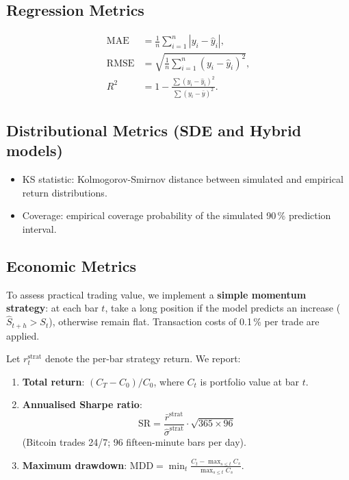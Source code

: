 \documentclass[12pt, a4paper, oneside]{report}
\theoremstyle{plain}
\theoremstyle{definition}
\theoremstyle{remark}
\begin{document}
\subsection{Regression Metrics}

\begin{align}
  \text{MAE} &= \tfrac{1}{n}\textstyle\sum_{i=1}^n |y_i - \hat y_i|, \\
  \text{RMSE} &= \sqrt{\tfrac{1}{n}\textstyle\sum_{i=1}^n (y_i - \hat y_i)^2}, \\
  R^2 &= 1 - \tfrac{\textstyle\sum (y_i - \hat y_i)^2}{\textstyle\sum (y_i - \bar y)^2}.
\end{align}

\subsection{Distributional Metrics (SDE and Hybrid models)}

\begin{itemize}[leftmargin=1.25cm]
  \item KS statistic: Kolmogorov-Smirnov distance between simulated and
    empirical return distributions.
  \item Coverage: empirical coverage probability of the simulated 90\,\%
    prediction interval.
\end{itemize}

\subsection{Economic Metrics}
\label{sec:econ_metrics}

To assess practical trading value, we implement a \textbf{simple momentum
strategy}: at each bar $t$, take a long position if the model predicts an
increase ($\hat S_{t+h} > S_t$), otherwise remain flat.  Transaction costs of
0.1\,\% per trade are applied.

Let $r_t^{\text{strat}}$ denote the per-bar strategy return.  We report:

\begin{enumerate}[leftmargin=1.25cm, label=\arabic*.]
  \item \textbf{Total return}: $(C_T - C_0) / C_0$, where $C_t$ is portfolio
    value at bar $t$.
  \item \textbf{Annualised Sharpe ratio}:
    \[
      \text{SR} = \frac{\bar r^{\text{strat}}}{\hat\sigma^{\text{strat}}}
        \cdot \sqrt{365 \times 96}
    \]
    (Bitcoin trades 24/7; 96 fifteen-minute bars per day).
  \item \textbf{Maximum drawdown}:
    $\text{MDD} = \min_t \frac{C_t - \max_{s \leq t} C_s}{\max_{s \leq t} C_s}$.
\end{enumerate}
\end{document}
